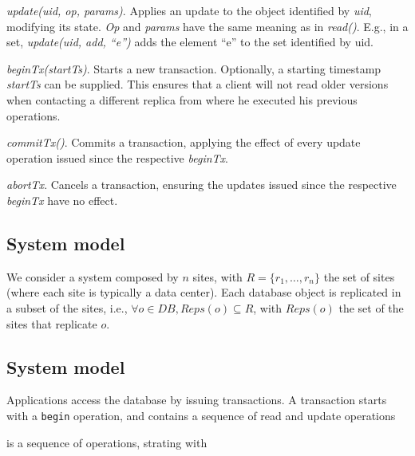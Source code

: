 \documentclass{vldb}
\newcommand{\grumbler}[2]{{\color{red}{\bf #1:} #2}}
\renewcommand{\grumbler}[2]{}
\newcommand{\andre}[1]{\grumbler{andre}{#1}}
\begin{document}
\emph{update(uid, op, params)}. Applies an update to the object identified by \emph{uid}, modifying its state.
\emph{Op} and \emph{params} have the same meaning as in \emph{read()}.
E.g., in a set, \emph{update(uid, add, ``e'')} adds the element ``e'' to the set identified by uid.

\emph{beginTx(startTs)}. Starts a new transaction. Optionally, a starting timestamp \emph{startTs} can be supplied. This ensures that a client will not read older versions when contacting a different replica from where he executed his previous operations.
\andre{TODO: Add reference to some place where I explain this properly...?}

\emph{commitTx()}. Commits a transaction, applying the effect of every update operation issued since the respective \emph{beginTx}.

\emph{abortTx}. Cancels a transaction, ensuring the updates issued since the respective \emph{beginTx} have no effect.

\andre{I think somewhere I'll have to explain the following: a) how beginTx works when receiving a startTs; b) how are commits/aborts handled (i.e., when updates are applied); c) that reads return right away and consider the temporary effects of updates issued in that transaction}




\subsection{System model}

We consider a system composed by $n$ sites, with $R = \{r_1,\ldots,r_n\}$ the set
of sites (where each site is typically a data center).
Each database object is replicated in a 
subset of the sites, i.e., $\forall o \in DB, Reps(o) \subseteq R$, with $Reps(o)$ the set
of the sites that replicate $o$.





\subsection{System model}


Applications access the database by issuing transactions. A transaction starts with a \texttt{begin} operation, 
and contains a sequence of read and update operations 

is a sequence of operations,
strating with %
\end{document}
